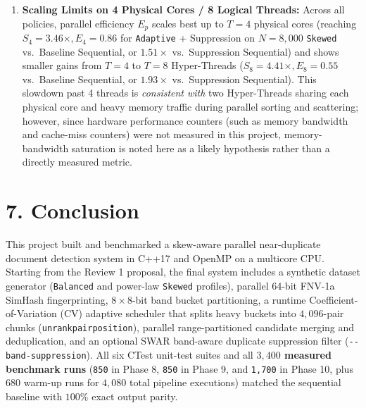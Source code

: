 \documentclass[11pt,a4paper]{article}
\renewcommand{\_}{\textunderscore\allowbreak}
\newcommand{\tocsection}[1]{%
  \phantomsection%
  \section*{#1}%
  \addcontentsline{toc}{section}{#1}%
}
\begin{document}
\begin{enumerate}
    \item \textbf{Scaling Limits on 4 Physical Cores / 8 Logical Threads:}
    Across all policies, parallel efficiency $E_p$ scales best up to $T=4$ physical cores (reaching $S_4 = 3.46\times, E_4 = 0.86$ for \texttt{Adaptive} + Suppression on $N=8,000$ \texttt{Skewed} vs.\ Baseline Sequential, or $1.51\times$ vs.\ Suppression Sequential) and shows smaller gains from $T=4$ to $T=8$ Hyper-Threads ($S_8 = 4.41\times, E_8 = 0.55$ vs.\ Baseline Sequential, or $1.93\times$ vs.\ Suppression Sequential). This slowdown past 4 threads is \textit{consistent with} two Hyper-Threads sharing each physical core and heavy memory traffic during parallel sorting and scattering; however, since hardware performance counters (such as memory bandwidth and cache-miss counters) were not measured in this project, memory-bandwidth saturation is noted here as a likely hypothesis rather than a directly measured metric.
\end{enumerate}

\tocsection{7. Conclusion}

This project built and benchmarked a skew-aware parallel near-duplicate document detection system in C++17 and OpenMP on a multicore CPU. Starting from the Review 1 proposal, the final system includes a synthetic dataset generator (\texttt{Balanced} and power-law \texttt{Skewed} profiles), parallel 64-bit FNV-1a SimHash fingerprinting, $8 \times 8$-bit band bucket partitioning, a runtime Coefficient-of-Variation ($\text{CV}$) adaptive scheduler that splits heavy buckets into $4,096$-pair chunks (\texttt{unrank\_pair\_position}), parallel range-partitioned candidate merging and deduplication, and an optional SWAR band-aware duplicate suppression filter (\texttt{-{}-band-suppression}). All six CTest unit-test suites and all \textbf{$3,400$ measured benchmark runs} (\texttt{850} in Phase 8, \texttt{850} in Phase 9, and \texttt{1,700} in Phase 10, plus $680$ warm-up runs for $4,080$ total pipeline executions) matched the sequential baseline with $100\%$ exact output parity.
\end{document}
